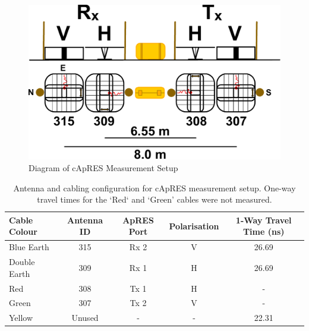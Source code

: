 \documentclass[a4paper,12pt]{article}
\begin{document}
\begin{figure}[H]
  \includegraphics[width=\linewidth]{Figures/cApRES.pdf}
  \caption{Diagram of cApRES Measurement Setup}
  \label{fig_cApRES}
\end{figure}

\begin{table}[H]
  \centering
  \begin{tabular}[width=\textwidth]{l c c c c}
    \hline
    \rowcolor{gray!50}
    Cable Colour & Antenna ID & ApRES Port & Polarisation & 1-Way Travel Time (ns) \\
    \hline
    Blue Earth & 315 & Rx 2 & V & 26.69 \\
    Double Earth & 309 & Rx 1 & H & 26.69 \\
    Red & 308 & Tx 1 & H & - \\
    Green & 307 & Tx 2 & V  & - \\
    Yellow & Unused & - & - & 22.31 \\
    \hline
  \end{tabular}
  \caption{Antenna and cabling configuration for cApRES measurement setup.  
  One-way travel times for the `Red` and `Green' cables were not measured.}
  \label{TablecApRESCables}
\end{table}
\end{document}
